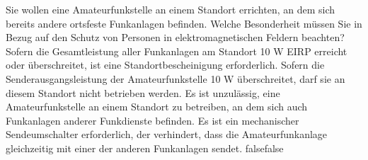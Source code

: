     {Sie wollen eine Amateurfunkstelle an einem Standort errichten, an dem sich bereits andere ortsfeste Funkanlagen befinden. Welche Besonderheit müssen Sie in Bezug auf den Schutz von Personen in elektromagnetischen Feldern beachten?}
    {Sofern die Gesamtleistung aller Funkanlagen am Standort 10 W EIRP erreicht oder überschreitet, ist eine Standortbescheinigung erforderlich.}
    {Sofern die Senderausgangsleistung der Amateurfunkstelle 10 W überschreitet, darf sie an diesem Standort nicht betrieben werden.}
    {Es ist unzulässig, eine Amateurfunkstelle an einem Standort zu betreiben, an dem sich auch Funkanlagen anderer Funkdienste befinden.}
    {Es ist ein mechanischer Sendeumschalter erforderlich, der verhindert, dass die Amateurfunkanlage gleichzeitig mit einer der anderen Funkanlagen sendet.}
    {false}{false}